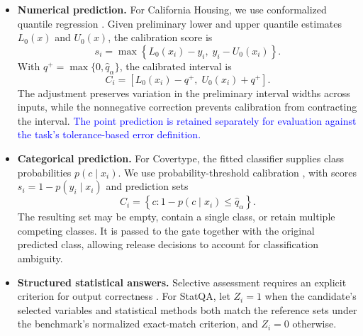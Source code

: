 \documentclass[preprint,12pt,authoryear]{elsarticle}
\begin{document}
\begin{itemize}

    \item \textbf{Numerical prediction.}
    For California Housing, we use conformalized quantile regression
    \citep{romano2019cqr}. Given preliminary lower and upper quantile
    estimates \(L_0(x)\) and \(U_0(x)\), the calibration score is
    \begin{equation}
        s_i
        =
        \max\left\{
            L_0(x_i)-y_i,\;
            y_i-U_0(x_i)
        \right\}.
        \label{eq:cqr_nonconformity}
    \end{equation}
    With \(q^{+}=\max\{0,\widehat q_\alpha\}\), the calibrated interval is
    \begin{equation}
        C_i
        =
        \left[
            L_0(x_i)-q^{+},\;
            U_0(x_i)+q^{+}
        \right].
        \label{eq:cqr_calibrated_interval}
    \end{equation}
    The adjustment preserves variation in the preliminary interval
    widths across inputs, while the nonnegative correction prevents
    calibration from contracting the interval. \textcolor{blue}{The point prediction
    is retained separately for evaluation against the task's
    tolerance-based error definition.}

    \item \textbf{Categorical prediction.}
    For Covertype, the fitted classifier supplies class probabilities
    \(p(c\mid x_i)\). We use probability-threshold calibration
    \citep{angelopoulos2023gentle}, with scores
    \(s_i=1-p(y_i\mid x_i)\) and prediction sets
    \begin{equation}
        C_i
        =
        \left\{
            c:
            1-p(c\mid x_i)\leq\widehat q_\alpha
        \right\}.
        \label{eq:categorical_prediction_set}
    \end{equation}
    The resulting set may be empty, contain a single class, or retain
    multiple competing classes. It is passed to the gate together
    with the original predicted class, allowing release decisions
    to account for classification ambiguity.

    \item \textbf{Structured statistical answers.}
    Selective assessment requires an explicit criterion for output
    correctness \citep{lee2024selective}. For StatQA, let \(Z_i=1\)
    when the candidate's selected variables and statistical methods
    both match the reference sets under the benchmark's normalized
    exact-match criterion, and \(Z_i=0\) otherwise.


\end{itemize}
\end{document}
